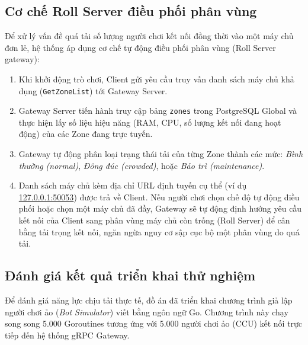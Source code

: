 \documentclass[../Project.tex]{subfiles}
\begin{document}
\subsection{Cơ chế Roll Server điều phối phân vùng}
Để xử lý vấn đề quá tải số lượng người chơi kết nối đồng thời vào một máy chủ đơn lẻ, hệ thống áp dụng cơ chế tự động điều phối phân vùng (Roll Server gateway):
\begin{enumerate}
    \item Khi khởi động trò chơi, Client gửi yêu cầu truy vấn danh sách máy chủ khả dụng (\texttt{GetZoneList}) tới Gateway Server.
    \item Gateway Server tiến hành truy cập bảng \texttt{zones} trong PostgreSQL Global và thực hiện lấy số liệu hiệu năng (RAM, CPU, số lượng kết nối đang hoạt động) của các Zone đang trực tuyến.
    \item Gateway tự động phân loại trạng thái tải của từng Zone thành các mức: \textit{Bình thường (normal)}, \textit{Đông đúc (crowded)}, hoặc \textit{Bảo trì (maintenance)}.
    \item Danh sách máy chủ kèm địa chỉ URL định tuyến cụ thể (ví dụ \url{127.0.0.1:50053}) được trả về Client. Nếu người chơi chọn chế độ tự động điều phối hoặc chọn một máy chủ đã đầy, Gateway sẽ tự động định hướng yêu cầu kết nối của Client sang phân vùng máy chủ còn trống (Roll Server) để cân bằng tải trọng kết nối, ngăn ngừa nguy cơ sập cục bộ một phân vùng do quá tải.
\end{enumerate}

\subsection{Đánh giá kết quả triển khai thử nghiệm}
Để đánh giá năng lực chịu tải thực tế, đồ án đã triển khai chương trình giả lập người chơi ảo (\textit{Bot Simulator}) viết bằng ngôn ngữ Go. Chương trình này chạy song song 5.000 Goroutines tương ứng với 5.000 người chơi ảo (CCU) kết nối trực tiếp đến hệ thống gRPC Gateway.
\end{document}
